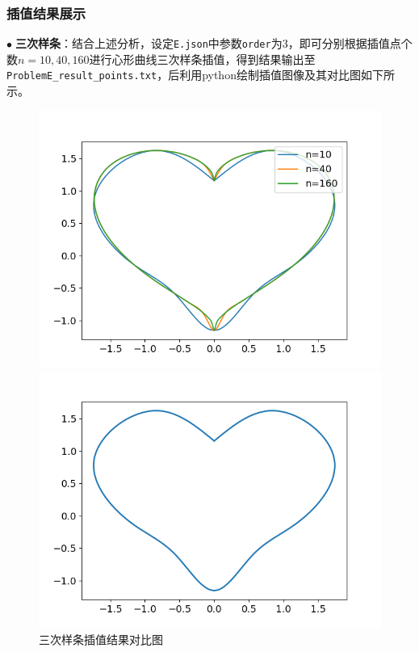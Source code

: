 \documentclass{ctexart}
\begin{document}
\begin{sloppypar}
\subsubsection{插值结果展示}
$\bullet \;$\textbf{三次样条}：结合上述分析，设定\verb|E.json|中参数\verb|order|为3，即可分别根据插值点个数$n=10,40,160$进行心形曲线三次样条插值，得到结果输出至\verb|ProblemE_result_points.txt|，后利用python绘制插值图像及其对比图如下所示。
\begin{figure}[H]
  \begin{minipage}[t]{0.5\linewidth}
    \centering
    \includegraphics[scale = 0.45]{fig//ProblemE_heartplotx3.png}
    \caption{三次样条插值结果对比图}
  \end{minipage}
  \begin{minipage}[t]{0.5\linewidth}
    \centering
    \includegraphics[scale = 0.45]{fig//ProblemE_heartplot_10.png}

\end{minipage}
\end{figure}
\end{sloppypar}
\end{document}

